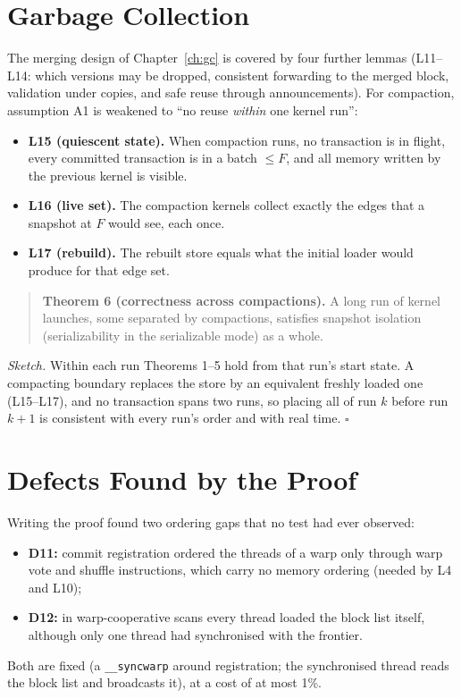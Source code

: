 \documentclass[11pt,a4paper,oneside]{report}
\newcommand{\code}[1]{\texttt{#1}}
\begin{document}
\section{Garbage Collection}
The merging design of Chapter~\ref{ch:gc} is covered by four further lemmas (L11--L14: which versions may be dropped,
consistent forwarding to the merged block, validation under copies, and safe reuse through announcements). For
compaction, assumption A1 is weakened to ``no reuse \emph{within} one kernel run'':
\begin{itemize}
\item \textbf{L15 (quiescent state).} When compaction runs, no transaction is in flight, every committed transaction
  is in a batch $\le F$, and all memory written by the previous kernel is visible.
\item \textbf{L16 (live set).} The compaction kernels collect exactly the edges that a snapshot at $F$ would see, each
  once.
\item \textbf{L17 (rebuild).} The rebuilt store equals what the initial loader would produce for that edge set.
\end{itemize}
\begin{quote}
\textbf{Theorem 6 (correctness across compactions).} A long run of kernel launches, some separated by compactions,
satisfies snapshot isolation (serializability in the serializable mode) as a whole.
\end{quote}
\emph{Sketch.} Within each run Theorems 1--5 hold from that run's start state. A compacting boundary replaces the store
by an equivalent freshly loaded one (L15--L17), and no transaction spans two runs, so placing all of run $k$ before run
$k{+}1$ is consistent with every run's order and with real time. \hfill$\square$

\section{Defects Found by the Proof}
Writing the proof found two ordering gaps that no test had ever observed:
\begin{itemize}
\item \textbf{D11:} commit registration ordered the threads of a warp only through warp vote and shuffle instructions,
  which carry no memory ordering (needed by L4 and L10);
\item \textbf{D12:} in warp-cooperative scans every thread loaded the block list itself, although only one thread had
  synchronised with the frontier.
\end{itemize}
Both are fixed (a \code{\_\_syncwarp} around registration; the synchronised thread reads the block list and broadcasts
it), at a cost of at most 1\%.
\end{document}
